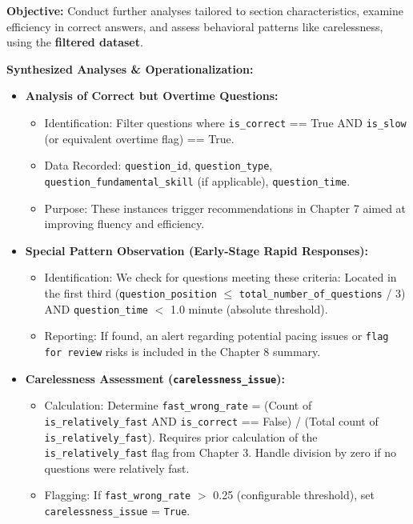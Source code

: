 \documentclass{article}
\begin{document}
\textbf{Objective:} Conduct further analyses tailored to section characteristics, examine efficiency in correct answers, and assess behavioral patterns like carelessness, using the \textbf{filtered dataset}.

\textbf{Synthesized Analyses \& Operationalization:}
\begin{itemize}
    \item \textbf{Analysis of Correct but Overtime Questions:}
    \begin{itemize}
        \item Identification: Filter questions where \texttt{is\_correct} == True AND \texttt{is\_slow} (or equivalent overtime flag) == True.
        \item Data Recorded: \texttt{question\_id}, \texttt{question\_type}, \texttt{question\_fundamental\_skill} (if applicable), \texttt{question\_time}.
        \item Purpose: These instances trigger recommendations in Chapter 7 aimed at improving fluency and efficiency.
    \end{itemize}
    \item \textbf{Special Pattern Observation (Early-Stage Rapid Responses):}
    \begin{itemize}
        \item Identification: We check for questions meeting these criteria:
        Located in the first third (\texttt{question\_position} $\leq$ \texttt{total\_number\_of\_questions} / 3) AND \texttt{question\_time} $<$ 1.0 minute (absolute threshold). %
        \item Reporting: If found, an alert regarding potential pacing issues or \texttt{flag for review} risks is included in the Chapter 8 summary.
    \end{itemize}
    \item \textbf{Carelessness Assessment (\texttt{carelessness\_issue}):}
    \begin{itemize}
        \item Calculation: Determine \texttt{fast\_wrong\_rate} = (Count of \texttt{is\_relatively\_fast} AND \texttt{is\_correct} == False) / (Total count of \texttt{is\_relatively\_fast}). Requires prior calculation of the \texttt{is\_relatively\_fast} flag from Chapter 3. Handle division by zero if no questions were relatively fast.
        \item Flagging: If \texttt{fast\_wrong\_rate} $>$ 0.25 (configurable threshold), set \texttt{carelessness\_issue} = \texttt{True}. %

\end{itemize}
\end{itemize}
\end{document}
